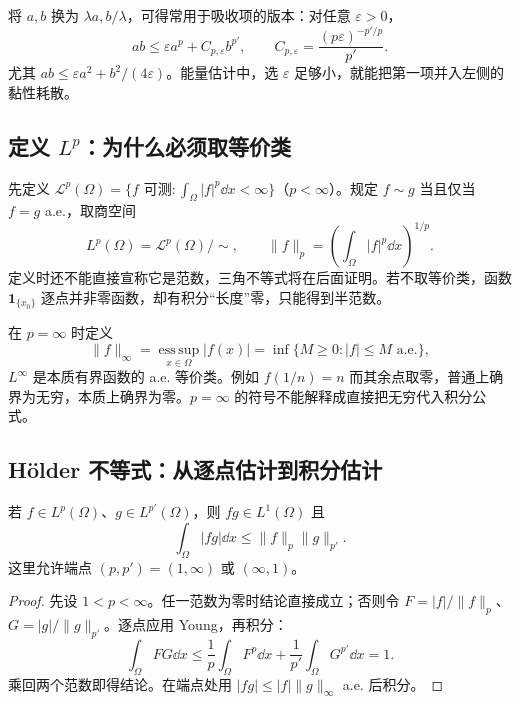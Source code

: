 将 $a,b$ 换为 $\lambda a,b/\lambda$，可得常用于吸收项的版本：对任意 $\varepsilon>0$，
\begin{equation}
 ab\le\varepsilon a^p+C_{p,\varepsilon}b^{p'},\qquad
 C_{p,\varepsilon}=\frac{(p\varepsilon)^{-p'/p}}{p'}.
 \label{eq:lp-young-eps}
\end{equation}
尤其 $ab\le\varepsilon a^2+b^2/(4\varepsilon)$。能量估计中，选 $\varepsilon$ 足够小，就能把第一项并入左侧的黏性耗散。

\subsection{定义 \texorpdfstring{$L^p$}{Lp}：为什么必须取等价类}

先定义 $\mathcal L^p(\Omega)=\{f\text{ 可测}:\int_\Omega|f|^p\dd x<\infty\}$（$p<\infty$）。规定 $f\sim g$ 当且仅当 $f=g$ a.e.，取商空间
\begin{equation}
 L^p(\Omega)=\mathcal L^p(\Omega)/\!\sim,\qquad
 \|f\|_p=\left(\int_\Omega|f|^p\dd x\right)^{1/p}.
 \label{eq:lp-definition}
\end{equation}
定义时还不能直接宣称它是范数，三角不等式将在后面证明。若不取等价类，函数 $\mathbf1_{\{x_0\}}$ 逐点并非零函数，却有积分“长度”零，只能得到半范数。

在 $p=\infty$ 时定义
\begin{equation}
 \|f\|_\infty=\operatorname*{ess\,sup}_{x\in\Omega}|f(x)|
 =\inf\{M\ge0:|f|\le M\text{ a.e.}\},
 \label{eq:lp-infinity}
\end{equation}
$L^\infty$ 是本质有界函数的 a.e. 等价类。例如 $f(1/n)=n$ 而其余点取零，普通上确界为无穷，本质上确界为零。$p=\infty$ 的符号不能解释成直接把无穷代入积分公式。

\subsection{H\"older 不等式：从逐点估计到积分估计}

\begin{theorem}\label{thm:lp-holder}
若 $f\in L^p(\Omega)$、$g\in L^{p'}(\Omega)$，则 $fg\in L^1(\Omega)$ 且
\begin{equation}
 \boxed{\int_\Omega|fg|\dd x\le\|f\|_p\|g\|_{p'}.}
 \label{eq:lp-holder}
\end{equation}
这里允许端点 $(p,p')=(1,\infty)$ 或 $(\infty,1)$。
\end{theorem}
\begin{proof}
先设 $1<p<\infty$。任一范数为零时结论直接成立；否则令 $F=|f|/\|f\|_p$、$G=|g|/\|g\|_{p'}$。逐点应用 Young，再积分：
\[
 \int_\Omega FG\dd x
 \le\frac1p\int_\Omega F^p\dd x+
 \frac1{p'}\int_\Omega G^{p'}\dd x=1.
\]
乘回两个范数即得结论。在端点处用 $|fg|\le|f|\|g\|_\infty$ a.e. 后积分。
\end{proof}

